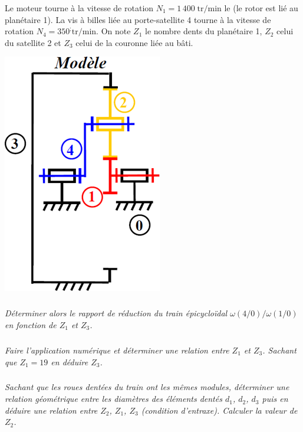 \documentclass[10pt,fleqn]{article} %
\begin{document}
\begin{multicols}{2}
Le moteur tourne à la vitesse de rotation $N_1=1\,400\;\text{tr/min}$ le (le rotor est lié au planétaire 1). La vis à billes liée au porte-satellite 4 tourne à la vitesse de rotation $N_4=350^; \text{tr/min}$. On note $Z_1$ le nombre dents du planétaire 1, $Z_2$ celui du satellite 2 et $Z_3$ celui de la couronne liée au bâti.

\begin{center}
 \includegraphics[width=.6\linewidth]{images/secateur3}
\end{center}



\subparagraph{}
\textit{Déterminer alors le rapport de réduction du train épicycloïdal $\omega(4/0)/\omega(1/0)$ en fonction de $Z_1$ et $Z_3$.}

\subparagraph{}
\textit{Faire l’application numérique et déterminer une relation entre $Z_1$ et $Z_3$. Sachant que $Z_1=19$ en déduire $Z_3$.}

\subparagraph{}
\textit{Sachant que les roues dentées du train ont les mêmes modules, déterminer une relation géométrique entre les diamètres des éléments dentés $d_1$, $d_2$, $d_3$ puis en déduire une relation entre $Z_2$, $Z_1$, $Z_3$ (condition d’entraxe). Calculer la valeur de $Z_2$.}



\end{multicols}
\end{document}
